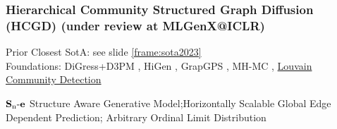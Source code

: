 \documentclass[./presentation.tex]{subfiles}
\begin{document}
\begin{frame}[t,label=hcgdintro]
  \frametitle{\textbf{H}ierarchical \textbf{C}ommunity Structured \textbf{G}raph \textbf{D}iffusion (HCGD) (under review at MLGenX@ICLR)}
  \vspace{-1cm}
  \begin{priorart}
    Prior Closest SotA: see slide \ref{frame:sota2023}\\%
    Foundations: DiGress+D3PM \citep{krawczukGGGANGeometricGraph2020,austinStructuredDenoisingDiffusion2021e}, HiGen \citep{karamiHiGenHierarchicalGraph2023a}, GrapGPS \citep{rampasekRecipeGeneralPowerful2022b}, MH-MC \citep{metropolisEquationStateCalculations1953a}, 
    \hyperlink{hcgdbackuplouvain}{Louvain Community Detection} \citep{newmanFindingEvaluatingCommunity2004,blondelFastUnfoldingCommunities2008d}
  \end{priorart}
  \begin{contributions}
    $\operatorname{\mathbf{S}_n\mathbf{-e}}$ Structure Aware Generative Model;Horizontally Scalable Global Edge Dependent Prediction; Arbitrary Ordinal Limit Distribution
  \end{contributions}
\end{frame}
\end{document}
